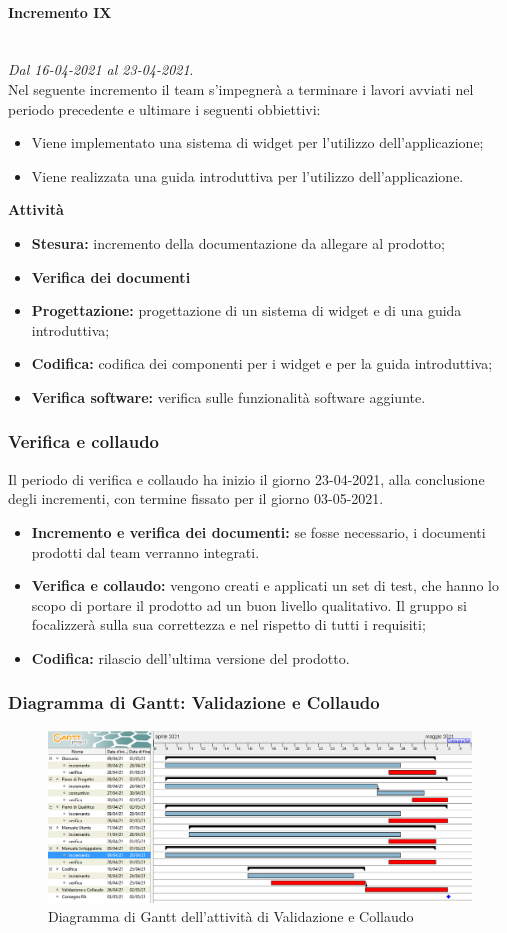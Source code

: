 \paragraph{Incremento IX}\textit{}\\
\textit{Dal 16-04-2021 al 23-04-2021}. \\ 
Nel seguente incremento il team s'impegnerà a terminare i lavori avviati nel periodo precedente e ultimare i seguenti obbiettivi:
\begin{itemize}
	\item Viene implementato una sistema di widget per l'utilizzo dell'applicazione;
	\item Viene realizzata una guida introduttiva per l'utilizzo dell'applicazione.
\end{itemize}			
\textbf{Attività}			
\begin{itemize}
\item \textbf{Stesura:} incremento della documentazione da allegare al prodotto;
\item \textbf{Verifica dei documenti} 
\item \textbf{Progettazione:} progettazione di un sistema di widget e di una guida introduttiva;
\item \textbf{Codifica:} codifica dei componenti per i widget e per la guida introduttiva;
\item \textbf{Verifica software:} verifica sulle funzionalità software aggiunte.
\end{itemize}
\subsubsection{Verifica e collaudo}
Il periodo di verifica e collaudo ha inizio il giorno 23-04-2021, alla conclusione degli incrementi, con termine fissato per il giorno 03-05-2021.
\begin{itemize}
	\item \textbf{Incremento e verifica dei documenti:} se fosse necessario, i documenti prodotti dal team verranno integrati.
	\item \textbf{Verifica e collaudo:} vengono creati e applicati un set di test, che hanno lo scopo di portare il prodotto ad un buon livello qualitativo. Il gruppo si focalizzerà sulla sua correttezza e nel rispetto di tutti i requisiti;
	\item \textbf{Codifica:} rilascio dell'ultima versione del prodotto.
\end{itemize}

\subsubsection{Diagramma di Gantt: Validazione e Collaudo}
\begin{figure}[h]
	\centering
	\includegraphics[scale=0.5]{Images/GanttValidazioneCollaudo.PNG}
	\caption{Diagramma di Gantt dell'attività di Validazione e Collaudo}
\end{figure}